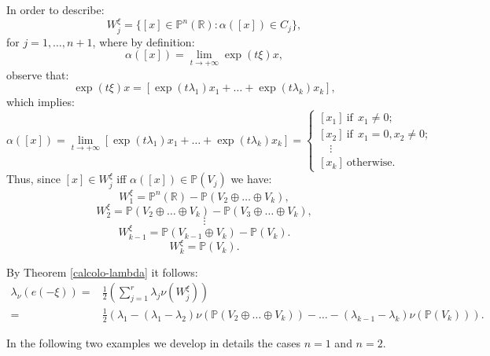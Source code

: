 \documentclass[leqno,11pt, a4]{amsart}
\theoremstyle{named}
\begin{document}
 In order to describe:
$$
W_j^\xi=\{ [x]\in \mathds{P}^n(\mathds{R}): {\alpha} ([x]) \in C_j \},
$$
 for $j=1,\dots, n+1$, where by definition:
$$
 {\alpha}([x]) = \lim_{t\to +\infty}  \exp(t\xi )  x,
$$
observe that:
$$
 \exp(t\xi )  x=[\exp(t\lambda_1)x_1+\dots+\exp(t\lambda_{k})x_{k}],
$$
which implies:
\begin{equation}
 {\alpha}([x]) =\lim_{t\to +\infty}[ \exp(t\lambda_1)x_1+\dots+\exp(t\lambda_{k})x_{k}]=\begin{cases} [x_1]\  {\textrm{if}}\ \ x_1\neq 0;\\
[x_2]\  {\textrm{if}}\ \ x_1=0, x_2\neq 0;\\
 \quad\vdots\\
 [x_k] \ {\textrm{otherwise}.}
 \end{cases}\nonumber
\end{equation}
Thus, since $[x]\in W_j^\xi$ iff ${\alpha}([x])\in \mathds{P}(V_j)$ we have:
$$
W_1^\xi=\mathds{P}^{n}(\mathds{R}){-} \mathds{P}(V_2\oplus\dots\oplus V_k),
$$
$$
W_2^\xi=\mathds{P}(V_2\oplus\dots\oplus V_k){-} \mathds{P}(V_3\oplus\dots\oplus V_k),
$$
$$
\vdots
$$
$$
W_{k-1}^\xi=\mathds{P}(V_{k-1}\oplus V_k){-} \mathds{P}(V_k).
$$
$$
W_k^\xi=\mathds{P}(V_k).
$$

By Theorem \ref{calcolo-lambda} it follows:
\begin{equation}\label{lambdaxi}
\begin{split}
\lambda_\nu(e(-\xi))=&\frac12\left(\sum_{j=1}^r\lambda_j\nu (W_j^\xi)\right)\\
=&\frac12\left(\lambda_1-(\lambda_1-\lambda_2)\nu(\mathds{P}(V_2\oplus\dots\oplus V_k))-\dots-(\lambda_{k-1}-\lambda_k)\nu(\mathds{P}(V_k))\right).
\end{split}
\end{equation}

In the following two examples we develop in details the cases $n=1$ and $n=2$.
\end{document}
